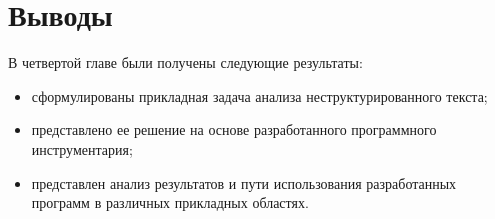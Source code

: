 \section{Выводы}

В четвертой главе были получены следующие результаты:
\begin{itemize}
\item сформулированы прикладная задача анализа неструктурированного текста;
\item представлено ее решение на основе разработанного программного инструментария;
\item представлен анализ результатов и пути использования разработанных программ в различных прикладных областях. 
\end{itemize}

